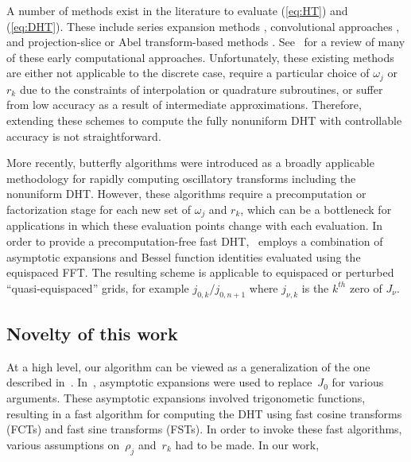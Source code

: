 A number of methods exist in the literature to evaluate (\ref{eq:HT}) and
(\ref{eq:DHT}). These include series expansion methods
\cite{lord1954b,brunol1977fourier,cavanagh1979numerical}, convolutional
approaches \cite{siegman1977quasi, johansen1979fast, mook1983algorithm,
liu1999nonuniform}, and projection-slice or Abel transform-based methods
\cite{oppenheim1980computation, hansen1985fast, kapur1995algorithm}.
See~\cite{cree1993algorithms} for a review of many of these early computational
approaches. Unfortunately, these existing methods are either not applicable to
the discrete case, require a particular choice of $\omega_j$ or $r_k$ due to the
constraints of interpolation or quadrature subroutines, or suffer from low
accuracy as a result of intermediate approximations. Therefore, extending these
schemes to compute the fully nonuniform DHT with controllable accuracy is not
straightforward.

More recently, butterfly algorithms \cite{oneil2010algorithm, li2015butterfly,
  pang2020interpolative} were introduced as a broadly applicable methodology for
  rapidly computing oscillatory transforms including the nonuniform DHT.
  However, these algorithms require a precomputation or factorization stage for
  each new set of $\omega_j$ and $r_k$, which can be a bottleneck for
  applications in which these evaluation points change with each evaluation. In
  order to provide a precomputation-free fast DHT,~\cite{townsend2015fast}
  employs a combination of asymptotic expansions and Bessel function identities
  evaluated using the equispaced FFT. The resulting scheme is applicable to
  equispaced or perturbed ``quasi-equispaced'' grids, for example $j_{0,k} /
  j_{0,n+1}$ where $j_{\nu,k}$ is the $k^{th}$ zero of $J_\nu$.


\subsection*{Novelty of this work}

At a high level, our algorithm can be viewed as a generalization of the one
described in~\cite{townsend2015fast}. In~\cite{townsend2015fast}, asymptotic
expansions were used to replace~$J_0$ for various arguments. These asymptotic
expansions involved trigonometic functions, resulting in a fast algorithm for
computing the DHT using fast cosine transforms (FCTs) and fast sine transforms
(FSTs). In order to invoke these fast algorithms, various assumptions
on~$\rho_j$ and~$r_k$ had to be made. In our work, 


